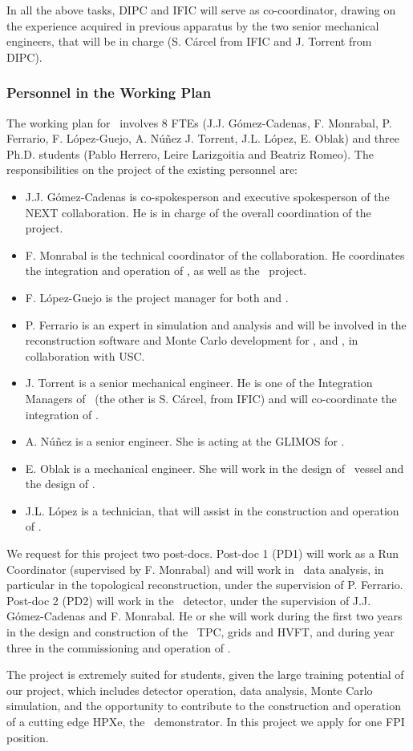 \indent

In all the above tasks, DIPC and IFIC will serve as co-coordinator, drawing on the experience acquired in previous apparatus by the two senior mechanical engineers, that will be in charge (S. C\'arcel from IFIC and J. Torrent from DIPC). 

\subsubsection*{Personnel in the Working Plan}
The working plan for \sDIPC\ involves 8 FTEs (J.J. G\'omez-Cadenas, F. Monrabal, P. Ferrario, F. L\'opez-Guejo, A. N\'u\~nez J. Torrent, J.L. L\'opez, E. Oblak) and three Ph.D. students (Pablo Herrero, Leire Larizgoitia and Beatriz Romeo). The responsibilities on the project of the existing personnel are:


\begin{itemize}[noitemsep,topsep=0pt,parsep=0pt,partopsep=0pt]
\item J.J. G\'omez-Cadenas is co-spokesperson and executive spokesperson of the NEXT collaboration. He is in charge of the overall coordination of the project. 
\item F. Monrabal is the technical coordinator of the collaboration. He coordinates the integration and operation of \Next, as well as the \HDEMO\ project.
\item  F. L\'opez-Guejo is the project manager  for both \Next and \NHD.
\item P. Ferrario is an expert in simulation and analysis and will be involved in the reconstruction software and Monte Carlo development for \Next, \HDEMO and \NHD, in collaboration with USC. 
\item J. Torrent is a senior mechanical engineer. He is one of the Integration Managers of \Next\ (the other is S. C\'arcel, from IFIC) and will co-coordinate the integration of \NHD. 
\item A. N\'u\~nez is a senior engineer. She is acting at the GLIMOS  for \Next. 
\item E. Oblak is a  mechanical engineer. She  will work in the design of \NHD\ vessel and the design of \HDEMO.  
\item J.L. L\'opez is a technician, that will assist in the construction and operation of \HDEMO. 
\end{itemize}

We request for this project two post-docs. Post-doc 1 (PD1) will work as a Run Coordinator (supervised by F. Monrabal) and will work in \Next\ data analysis, in particular in the topological reconstruction, under the supervision of P. Ferrario. Post-doc 2 (PD2) will work in the \HDEMO\ detector, under the supervision of J.J. G\'omez-Cadenas and F. Monrabal. He or she will work during the first two years in the design and construction of the
\HDEMO\ TPC, grids and HVFT, and during year three in the commissioning and operation of \NHD. 

The project is extremely suited for students, given the large training potential of our project, which includes detector operation, data analysis, Monte Carlo simulation, and the opportunity to contribute to the construction and operation of a cutting edge HPXe, the \HDEMO\ demonstrator. In this project we apply for one FPI position. 
